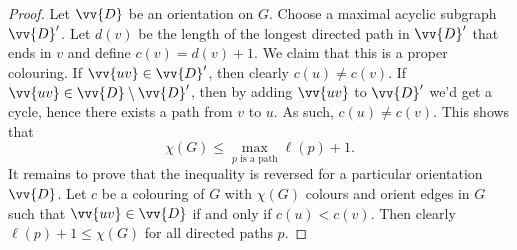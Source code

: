 \begin{proof}
Let $\vv{D}$ be an orientation on $G$. Choose a maximal acyclic
subgraph $\vv{D}'$. Let $d(v)$ be the length of the longest
directed path in $\vv{D}'$ that ends in $v$ and define
$c(v) = d(v) + 1$. We claim that this is a proper colouring. If
$\vv{uv} \in \vv{D}'$, then clearly $c(u) \ne c(v)$. If
$\vv{uv} \in \vv{D} \setminus \vv{D}'$, then by adding $\vv{uv}$ to
$\vv{D}'$ we'd get a cycle, hence there exists a path from
$v$ to $u$. As such, $c(u) \ne c(v)$. This shows that
\[
\chi(G) \leq
\max_{\text{$p$ is a path}} \ell(p)+1.
\]
It remains to prove that the inequality is reversed for a
particular orientation $\vv{D}$. Let $c$ be a colouring of $G$ with
$\chi(G)$ colours and orient edges in $G$ such that
$\vv{uv} \in \vv{D}$ if and only if $c(u) < c(v)$. Then clearly
$\ell(p) + 1 \leq \chi(G)$ for all directed paths $p$.
\end{proof}
